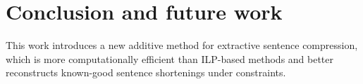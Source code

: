 \documentclass[11pt,a4paper]{article}
\begin{document}
\section{Conclusion and future work}

This work introduces a new additive method for extractive sentence compression, which is more computationally efficient than ILP-based methods and better reconstructs known-good sentence shortenings under constraints. 



%



\end{document}
